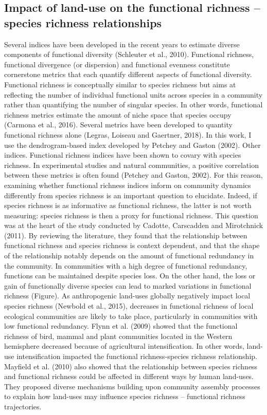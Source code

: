 \subsection{Impact of land-use on the functional richness – species richness relationships}
Several indices have been developed in the recent years to estimate diverse components of functional diversity (Schleuter et al., 2010). Functional richness, functional divergence (or dispersion) and functional evenness constitute cornerstone metrics that each quantify different aspects of functional diversity. Functional richness is conceptually similar to species richness but aims at reflecting the number of individual functional units across species in a community rather than quantifying the number of singular species. In other words, functional richness metrics estimate the amount of niche space that species occupy (Carmona et al., 2016). Several metrics have been developed to quantity functional richness alone (Legras, Loiseau and Gaertner, 2018). In this work, I use the dendrogram-based index developed by Petchey and Gaston (2002).
Other indices.
Functional richness indices have been shown to covary with species richness. In experimental studies and natural communities, a positive correlation between these metrics is often found (Petchey and Gaston, 2002). For this reason, examining whether functional richness indices inform on community dynamics differently from species richness is an important question to elucidate. Indeed, if species richness is as informative as functional richness, the latter is not worth measuring: species richness is then a proxy for functional richness. This question was at the heart of the study conducted by Cadotte, Carscadden and Mirotchnick (2011). By reviewing the literature, they found that the relationship between functional richness and species richness is context dependent, and that the shape of the relationship notably depends on the amount of functional redundancy in the community. In communities with a high degree of functional redundancy, functions can be maintained despite species loss. On the other hand, the loss or gain of functionally diverse species can lead to marked variations in functional richness (Figure).
As anthropogenic land-uses globally negatively impact local species richness (Newbold et al., 2015), decreases in functional richness of local ecological communities are likely to take place, particularly in communities with low functional redundancy. Flynn et al. (2009) showed that the functional richness of bird, mammal and plant communities located in the Western hemisphere decreased because of agricultural intensification. In other words, land-use intensification impacted the functional richness-species richness relationship. Mayfield et al. (2010) also showed that the relationship between species richness and functional richness could be affected in different ways by human land-uses. They proposed diverse mechanisms building upon community assembly processes to explain how land-uses may influence species richness – functional richness trajectories. 

